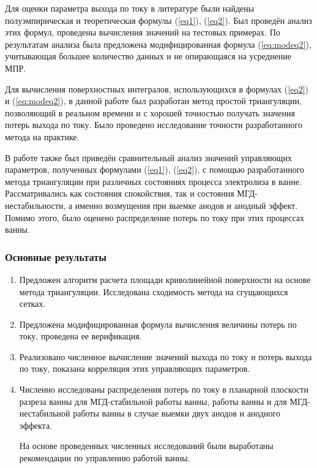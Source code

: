 \documentclass{article}
\begin{document}
Для оценки параметра выхода по току в литературе были найдены полуэмпирическая и теоретическая формулы (\ref{eq1}), (\ref{eq2}). Был проведён анализ этих формул, проведены вычисления значений на тестовых примерах. По результатам анализа была предложена модифицированная формула (\ref{eq:modeq2}), учитывающая большее количество данных и не опирающаяся на усреднение МПР.

Для вычисления поверхностных интегралов, использующихся в формулах (\ref{eq2}) и (\ref{eq:modeq2}), в данной работе был разработан метод простой триангуляции, позволяющий в реальном времени и с хорошей точностью получать значения потерь выхода по току. Было проведено исследование точности разработанного метода на практике.

В работе также был приведён сравнительный анализ значений управляющих параметров, полученных формулами (\ref{eq1}), (\ref{eq2}), с помощью разработанного метода триангуляции при различных состояниях процесса электролиза в ванне. Рассматривались как состояния спокойствия, так и состояния МГД-нестабильности, а именно возмущения при выемке анодов и анодный эффект. Помимо этого, было оценено распределение потерь по току при этих процессах ванны.

\subsubsection*{Основные результаты}

\begin{enumerate}
	\item Предложен алгоритм расчета площади криволинейной поверхности на основе метода триангуляции. Исследована сходимость метода на сгущающихся сетках.

	\item Предложена модифицированная формула вычисления величины потерь по току, проведена ее верификация.

	\item Реализовано численное вычисление значений выхода по току и потерь выхода по току, показана корреляция этих управляющих параметров.

	\item Численно исследованы распределения потерь по току в планарной плоскости разреза ванны для МГД-стабильной работы ванны, работы ванны и для МГД-нестабильной работы ванны в случае выемки двух анодов и анодного эффекта.

	На основе проведенных численных исследований были выработаны рекомендации по управлению работой ванны.
\end{enumerate}
\end{document}
